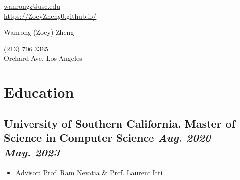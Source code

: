 \documentclass[a4,10pt]{article}
\newenvironment{zitemize}{
\begin{itemize}\itemsep0pt \parskip0pt \parsep1pt}
{\end{itemize}\vspace{-0.5cm}}
\newcommand{\hskills}[1]{
\textbf{\bfseries #1} }
\begin{document}
\begin{center}
    \begin{minipage}[b]{0.24\textwidth}
            {\href{mailto:wanrongz@usc.edu}{wanrongz@usc.edu} } \\
            \href{https://ZoeyZheng0.github.io/}{https://ZoeyZheng0.github.io/}
    \end{minipage}%
    \begin{minipage}[b]{0.52\textwidth}
            \centering
            {\LARGE Wanrong (Zoey) Zheng} \\ %
    \end{minipage}%
    \begin{minipage}[b]{0.24\textwidth}
            \flushright \large  %
            \normalsize (213) 706-3365 \\
            \normalsize Orchard Ave, Los Angeles
    \end{minipage}   


\end{center}


\section{Education }
\subsection*{University of Southern California, {\normalsize \normalfont Master of Science in Computer Science  \hfill \textit{Aug. 2020 --- May. 2023}}}
    \begin{zitemize}
        \item Advisor: Prof. \href{https://sites.usc.edu/iris-cvlab/professor-ram-nevatia/} {Ram Nevatia} \& Prof. \href{http://ilab.usc.edu/itti/} {Laurent Itti}
    \end{zitemize}
\end{document}
